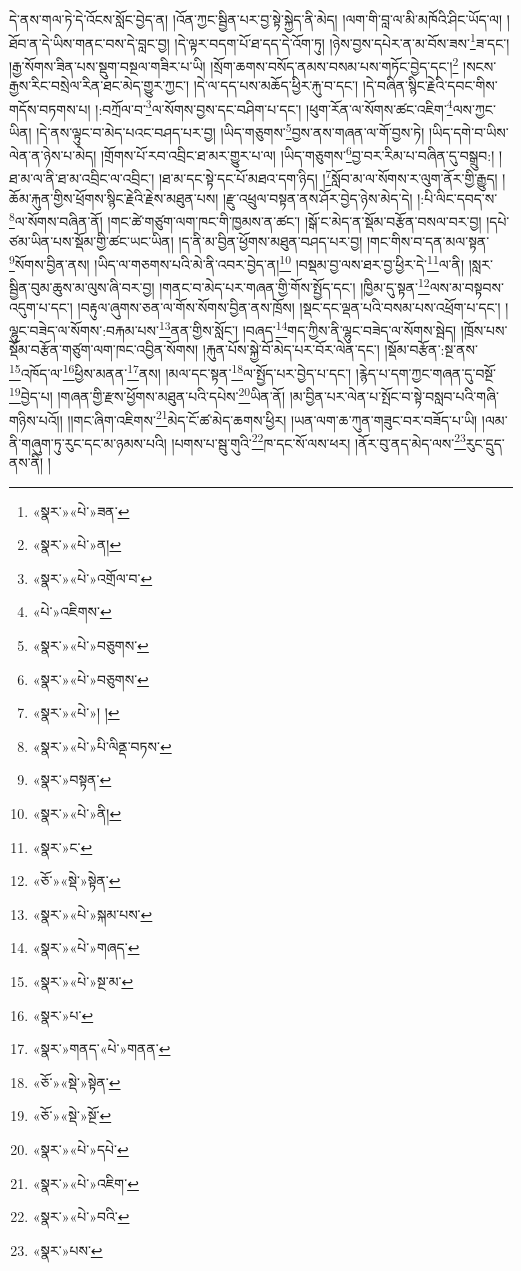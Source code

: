 དེ་ནས་གལ་ཏེ་དེ་འོངས་སློང་བྱེད་ན། །འོན་ཀྱང་སྦྱིན་པར་བྱ་སྟེ་སྐྱེད་ནི་མེད། །ལག་གི་བླ་ལ་མི་མཁོའི་ཤིང་ཡོད་ལ། །ཐོབ་ན་དེ་ཡིས་གནང་བས་དེ་བླང་བྱ། །དེ་ལྟར་བདག་པོ་ཐ་དད་དེ་འོག་ཏུ། །ཉེས་བྱས་དཔེར་ན་མ་བོས་ཟས་\footnote{«སྣར་»«པེ་»ཟན་}ཟ་དང་། །རྒྱ་སོགས་ཟིན་པས་སྡུག་བསྔལ་གཟིར་པ་ཡི། །སྲོག་ཆགས་བསོད་ནམས་བསམ་པས་གཏོང་བྱེད་དང་།\footnote{«སྣར་»«པེ་»ན།} །སངས་རྒྱས་རིང་བསྲེལ་རིན་ཐང་མེད་གྱུར་ཀྱང་། །དེ་ལ་དད་པས་མཆོད་ཕྱིར་རྐུ་བ་དང་། །དེ་བཞིན་སྙིང་རྗེའི་དབང་གིས་གདོས་བཏགས་པ། །:བཀྲོལ་བ་\footnote{«སྣར་»«པེ་»འགྲོལ་བ་}ལ་སོགས་བྱས་དང་བཤིག་པ་དང་། །ཕུག་རོན་ལ་སོགས་ཚང་འཇིག་\footnote{«པེ་»འཇིགས་}ལས་ཀྱང་ཡིན། །དེ་ནས་ལྟུང་བ་མེད་པའང་བཤད་པར་བྱ། །ཡིད་གཅུགས་\footnote{«སྣར་»«པེ་»བཅུགས་}བྱས་ནས་གཞན་ལ་གོ་བྱས་ཏེ། །ཡིད་དགེ་བ་ཡིས་ལེན་ན་ཉེས་པ་མེད། །གྲོགས་པོ་རབ་འབྲིང་ཐ་མར་གྱུར་པ་ལ། །ཡིད་གཅུགས་\footnote{«སྣར་»«པེ་»བཅུགས་}བྱ་བར་རིམ་པ་བཞིན་དུ་བསྒྲུབ:། །ཐ་མ་ལ་ནི་ཐ་མ་འབྲིང་ལ་འབྲིང་། །ཐ་མ་དང་སྟེ་དང་པོ་མཐའ་དག་ཉིད། །\footnote{«སྣར་»«པེ་»། །}སློབ་མ་ལ་སོགས་ར་ལུག་ནོར་གྱི་རྒྱུད། །ཆོམ་རྐུན་གྱིས་ཕྲོགས་སྙིང་རྗེའི་རྗེས་མཐུན་པས། །རྫུ་འཕྲུལ་བསྟན་ནས་ཤོར་བྱེད་ཉེས་མེད་དེ། །:པི་ལིང་དབད་ས་\footnote{«སྣར་»«པེ་»པི་ལིནྡ་བཏས་}ལ་སོགས་བཞིན་ནོ། །གང་ཚེ་གཙུག་ལག་ཁང་གི་ཁྱམས་ན་ཚང་། །སྒོ་ང་མེད་ན་སྡོམ་བརྩོན་བསལ་བར་བྱ། །དཔེ་ཙམ་ཡིན་པས་སྡོམ་གྱི་ཚང་ཡང་ཡིན། །ད་ནི་མ་བྱིན་ཕྱོགས་མཐུན་བཤད་པར་བྱ། །གང་གིས་བ་དན་མལ་སྟན་\footnote{«སྣར་»བསྟན་}སོགས་བྱིན་ནས། །ཡིད་ལ་གཅགས་པའི་མེ་ནི་འབར་བྱེད་ན།\footnote{«སྣར་»«པེ་»ནི།} །བསྡམ་བྱ་ལས་ཐར་བྱ་ཕྱིར་དེ་\footnote{«སྣར་»ང་}ལ་ནི། །སླར་སྦྱིན་བུམ་ཆུས་མ་ལུས་ཞི་བར་བྱ། །གནང་བ་མེད་པར་གཞན་གྱི་གོས་སྤྱོད་དང་། །ཁྱིམ་དུ་སྟན་\footnote{«ཅོ་»«སྡེ་»སྟེན་}ལས་མ་བསྟབས་འདུག་པ་དང་། །བརྟུལ་ཞུགས་ཅན་ལ་གོས་སོགས་བྱིན་ནས་ཁྲོས། །སྡང་དང་ལྡན་པའི་བསམ་པས་འཕྲོག་པ་དང་། །ལྷུང་བཟེད་ལ་སོགས་:བརྐམ་པས་\footnote{«སྣར་»«པེ་»སྐམ་པས་}ནན་གྱིས་སློང་། །བཞད་\footnote{«སྣར་»«པེ་»གཞད་}གད་ཀྱིས་ནི་ལྷུང་བཟེད་ལ་སོགས་སྦེད། །ཁྲོས་པས་སྡོམ་བརྩོན་གཙུག་ལག་ཁང་འབྱིན་སོགས། །རྐུན་པོས་སྐྱེ་བོ་མེད་པར་བོར་ལེན་དང་། །སྡོམ་བརྩོན་:སྔ་ནས་\footnote{«སྣར་»«པེ་»སྔ་མ་}འཁོད་ལ་\footnote{«སྣར་»པ་}ཕྱིས་མནན་\footnote{«སྣར་»གནད་«པེ་»གནན་}ནས། །མལ་དང་སྟན་\footnote{«ཅོ་»«སྡེ་»སྟེན་}ལ་སྤྱོད་པར་བྱེད་པ་དང་། །རྙེད་པ་དག་ཀྱང་གཞན་དུ་བསྔོ་\footnote{«ཅོ་»«སྡེ་»སྔོ་}བྱེད་པ། །གཞན་གྱི་རྫས་ཕྱོགས་མཐུན་པའི་དཔེས་\footnote{«སྣར་»«པེ་»དཔེ་}ཡིན་ནོ། །མ་བྱིན་པར་ལེན་པ་སྤོང་བ་སྟེ་བསླབ་པའི་གཞི་གཉིས་པའོ།། །།གང་ཞིག་འཇིགས་\footnote{«སྣར་»«པེ་»འཇིག་}མེད་ངོ་ཚ་མེད་ཆགས་ཕྱིར། །ཡན་ལག་ཆ་ཀུན་གཟུང་བར་བཟོད་པ་ཡི། །ལམ་ནི་གཞུག་ཏུ་རུང་དང་མ་ཉམས་པའི། །པགས་པ་སྦུ་གུའི་\footnote{«སྣར་»«པེ་»བའི་}ཁ་དང་སོ་ལས་ཕར། །ནོར་བུ་ནད་མེད་ལས་\footnote{«སྣར་»པས་}རུང་དྲུད་ནས་ནི། །
